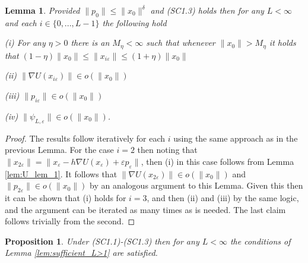 \documentclass[bj,numbers,noshowframe]{imsart}
\newcommand{\e}{\varepsilon}
\theoremstyle{definition}
\theoremstyle{plain}
\newtheorem{prop}[defn]{Proposition}
\newtheorem{lem}[defn]{Lemma}
\theoremstyle{definition}
\begin{document}
\begin{lem}
\label{lem:orders_L}Provided $\|p_{0}\|\leq\|x_{0}\|^{\delta}$ and
(SC1.3) holds then for any $L<\infty$ and each $i\in\{0,...,L-1\}$
the following hold
\vspace{0.2cm}

(i) For any $\eta>0$ there is an $M_{\eta}<\infty$ such that whenever
$\|x_{0}\|>M_{\eta}$ it holds that $(1-\eta)\|x_{0}\|\leq\|x_{i\e}\|\leq(1+\eta)\|x_{0}\|$
\vspace{0.2cm}

(ii) $\|\nabla U(x_{i\e})\|\in o(\|x_{0}\|)$
\vspace{0.2cm}

(iii) $\|p_{i\e}\|\in o(\|x_{0}\|)$
\vspace{0.1cm}

(iv) $\|\psi_{L,\e}\|\in o(\|x_{0}\|)$.
\end{lem}
\begin{proof}
The results follow iteratively for each $i$ using the same approach
as in the previous Lemma. For the case $i=2$ then noting that $\|x_{2\e}\|=\|x_{\e}-h\nabla U(x_{\e})+\e p_{\e}\|$,
then (i) in this case follows from Lemma \ref{lem:U_lem_1}. It follows
that $\|\nabla U(x_{2\e})\|\in o(\|x_{0}\|)$ and $\|p_{2\e}\|\in o(\|x_{0}\|)$
by an analogous argument to this Lemma. Given this then it can be
shown that (i) holds for $i=3$, and then (ii) and (iii) by the same
logic, and the argument can be iterated as many times as is needed.
The last claim follows trivially from the second.
\end{proof}
\begin{prop}
\label{prop:SC1.3}Under (SC1.1)-(SC1.3) then for any $L<\infty$
the conditions of Lemma \ref{lem:sufficient_L>1} are satisfied.
\end{prop}
\end{document}
